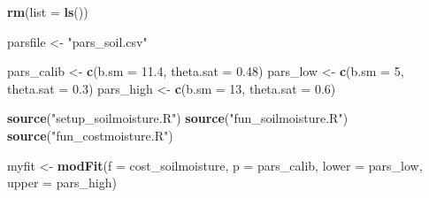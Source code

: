 \documentclass[
]{article}
\newenvironment{Shaded}{\begin{snugshade}}{\end{snugshade}}
\newcommand{\DataTypeTok}[1]{\textcolor[rgb]{0.13,0.29,0.53}{#1}}
\newcommand{\DecValTok}[1]{\textcolor[rgb]{0.00,0.00,0.81}{#1}}
\newcommand{\FloatTok}[1]{\textcolor[rgb]{0.00,0.00,0.81}{#1}}
\newcommand{\KeywordTok}[1]{\textcolor[rgb]{0.13,0.29,0.53}{\textbf{#1}}}
\newcommand{\NormalTok}[1]{#1}
\newcommand{\StringTok}[1]{\textcolor[rgb]{0.31,0.60,0.02}{#1}}
\begin{document}
\begin{Shaded}
\begin{Highlighting}[]
\KeywordTok{rm}\NormalTok{(}\DataTypeTok{list =} \KeywordTok{ls}\NormalTok{())}

\NormalTok{parsfile <-}\StringTok{ "pars_soil.csv"}

\NormalTok{pars_calib <-}\StringTok{ }\KeywordTok{c}\NormalTok{(}\DataTypeTok{b.sm =} \FloatTok{11.4}\NormalTok{, }\DataTypeTok{theta.sat =} \FloatTok{0.48}\NormalTok{)}
\NormalTok{pars_low <-}\StringTok{ }\KeywordTok{c}\NormalTok{(}\DataTypeTok{b.sm =} \DecValTok{5}\NormalTok{, }\DataTypeTok{theta.sat =} \FloatTok{0.3}\NormalTok{)}
\NormalTok{pars_high <-}\StringTok{ }\KeywordTok{c}\NormalTok{(}\DataTypeTok{b.sm =} \DecValTok{13}\NormalTok{, }\DataTypeTok{theta.sat =} \FloatTok{0.6}\NormalTok{)}

\KeywordTok{source}\NormalTok{(}\StringTok{"setup_soilmoisture.R"}\NormalTok{)}
\KeywordTok{source}\NormalTok{(}\StringTok{"fun_soilmoisture.R"}\NormalTok{)}
\KeywordTok{source}\NormalTok{(}\StringTok{"fun_costmoisture.R"}\NormalTok{)}

\NormalTok{myfit <-}\StringTok{ }\KeywordTok{modFit}\NormalTok{(}\DataTypeTok{f =}\NormalTok{ cost_soilmoisture, }\DataTypeTok{p =}\NormalTok{ pars_calib, }\DataTypeTok{lower =}\NormalTok{ pars_low, }\DataTypeTok{upper =}\NormalTok{ pars_high)}
\end{Highlighting}
\end{Shaded}
\end{document}
